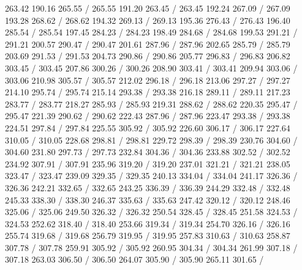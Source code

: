 { 263.42 190.16 265.55 /
 265.55 191.20 263.45 /
 263.45 192.24 267.09 /
 267.09 193.28 268.62 /
 268.62 194.32 269.13 /
 269.13 195.36 276.43 /
 276.43 196.40 285.54 /
 285.54 197.45 284.23 /
 284.23 198.49 284.68 /
 284.68 199.53 291.21 /
 291.21 200.57 290.47 /
 290.47 201.61 287.96 /
 287.96 202.65 285.79 /
 285.79 203.69 291.53 /
 291.53 204.73 290.86 /
 290.86 205.77 296.83 /
 296.83 206.82 303.45 /
 303.45 207.86 300.26 /
 300.26 208.90 303.41 /
 303.41 209.94 303.06 /
 303.06 210.98 305.57 /
 305.57 212.02 296.18 /
 296.18 213.06 297.27 /
 297.27 214.10 295.74 /
 295.74 215.14 293.38 /
 293.38 216.18 289.11 /
 289.11 217.23 283.77 /
 283.77 218.27 285.93 /
 285.93 219.31 288.62 /
 288.62 220.35 295.47 /
 295.47 221.39 290.62 /
 290.62 222.43 287.96 /
 287.96 223.47 293.38 /
 293.38 224.51 297.84 /
 297.84 225.55 305.92 /
 305.92 226.60 306.17 /
 306.17 227.64 310.05 /
 310.05 228.68 298.81 /
 298.81 229.72 298.39 /
 298.39 230.76 304.60 /
 304.60 231.80 297.73 /
 297.73 232.84 304.36 /
 304.36 233.88 302.52 /
 302.52 234.92 307.91 /
 307.91 235.96 319.20 /
 319.20 237.01 321.21 /
 321.21 238.05 323.47 /
 323.47 239.09 329.35 /
 329.35 240.13 334.04 /
 334.04 241.17 326.36 /
 326.36 242.21 332.65 /
 332.65 243.25 336.39 /
 336.39 244.29 332.48 /
 332.48 245.33 338.30 /
 338.30 246.37 335.63 /
 335.63 247.42 320.12 /
 320.12 248.46 325.06 /
 325.06 249.50 326.32 /
 326.32 250.54 328.45 /
 328.45 251.58 324.53 /
 324.53 252.62 318.40 /
 318.40 253.66 319.34 /
 319.34 254.70 326.16 /
 326.16 255.74 319.68 /
 319.68 256.79 319.95 /
 319.95 257.83 310.63 /
 310.63 258.87 307.78 /
 307.78 259.91 305.92 /
 305.92 260.95 304.34 /
 304.34 261.99 307.18 /
 307.18 263.03 306.50 /
 306.50 264.07 305.90 /
 305.90 265.11 301.65 /
}
